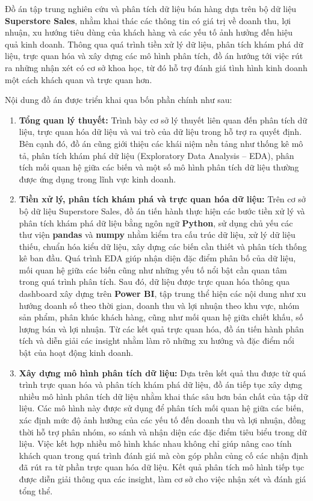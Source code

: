 \documentclass[oneside, a4paper]{book}
\theoremstyle{plain}
\theoremstyle{plain}
\theoremstyle{remark}
\theoremstyle{definition}
\theoremstyle{remark}
\begin{document}
	Đồ án tập trung nghiên cứu và phân tích dữ liệu bán hàng dựa trên bộ dữ liệu \textbf{Superstore Sales}, nhằm khai thác các thông tin có giá trị về doanh thu, lợi nhuận, xu hướng tiêu dùng của khách hàng và các yếu tố ảnh hưởng đến hiệu quả kinh doanh. Thông qua quá trình tiền xử lý dữ liệu, phân tích khám phá dữ liệu, trực quan hóa và xây dựng các mô hình phân tích, đồ án hướng tới việc rút ra những nhận xét có cơ sở khoa học, từ đó hỗ trợ đánh giá tình hình kinh doanh một cách khách quan và trực quan hơn.
	
	Nội dung đồ án được triển khai qua bốn phần chính như sau:
	
	\begin{enumerate}
		\item \textbf{Tổng quan lý thuyết:} Trình bày cơ sở lý thuyết liên quan đến phân tích dữ liệu, trực quan hóa dữ liệu và vai trò của dữ liệu trong hỗ trợ ra quyết định. Bên cạnh đó, đồ án cũng giới thiệu các khái niệm nền tảng như thống kê mô tả, phân tích khám phá dữ liệu (Exploratory Data Analysis -- EDA), phân tích mối quan hệ giữa các biến và một số mô hình phân tích dữ liệu thường được ứng dụng trong lĩnh vực kinh doanh.
		
		\item \textbf{Tiền xử lý, phân tích khám phá và trực quan hóa dữ liệu:} Trên cơ sở bộ dữ liệu Superstore Sales, đồ án tiến hành thực hiện các bước tiền xử lý và phân tích khám phá dữ liệu bằng ngôn ngữ \textbf{Python}, sử dụng chủ yếu các thư viện \textbf{pandas} và \textbf{numpy} nhằm kiểm tra cấu trúc dữ liệu, xử lý dữ liệu thiếu, chuẩn hóa kiểu dữ liệu, xây dựng các biến cần thiết và phân tích thống kê ban đầu. Quá trình EDA giúp nhận diện đặc điểm phân bố của dữ liệu, mối quan hệ giữa các biến cũng như những yếu tố nổi bật cần quan tâm trong quá trình phân tích. Sau đó, dữ liệu được trực quan hóa thông qua dashboard xây dựng trên \textbf{Power BI}, tập trung thể hiện các nội dung như xu hướng doanh số theo thời gian, doanh thu và lợi nhuận theo khu vực, nhóm sản phẩm, phân khúc khách hàng, cũng như mối quan hệ giữa chiết khấu, số lượng bán và lợi nhuận. Từ các kết quả trực quan hóa, đồ án tiến hành phân tích và diễn giải các insight nhằm làm rõ những xu hướng và đặc điểm nổi bật của hoạt động kinh doanh.
		
		\item \textbf{Xây dựng mô hình phân tích dữ liệu:} Dựa trên kết quả thu được từ quá trình trực quan hóa và phân tích khám phá dữ liệu, đồ án tiếp tục xây dựng nhiều mô hình phân tích dữ liệu nhằm khai thác sâu hơn bản chất của tập dữ liệu. Các mô hình này được sử dụng để phân tích mối quan hệ giữa các biến, xác định mức độ ảnh hưởng của các yếu tố đến doanh thu và lợi nhuận, đồng thời hỗ trợ phân nhóm, so sánh và nhận diện các đặc điểm tiêu biểu trong dữ liệu. Việc kết hợp nhiều mô hình khác nhau không chỉ giúp nâng cao tính khách quan trong quá trình đánh giá mà còn góp phần củng cố các nhận định đã rút ra từ phần trực quan hóa dữ liệu. Kết quả phân tích mô hình tiếp tục được diễn giải thông qua các insight, làm cơ sở cho việc nhận xét và đánh giá tổng thể.
		

\end{enumerate}
\end{document}
